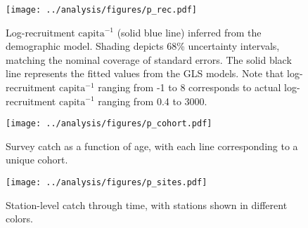 \documentclass[11pt]{article}
\begin{document}
\clearpage
\begin{figure}
\centering
\texttt{[image: ../analysis/figures/p\_rec.pdf]}
\caption{\label{fig:p_rec}
Log-recruitment $\text{capita}^{-1}$ (solid blue line) inferred from the demographic model.
Shading depicts 68\% uncertainty intervals, 
matching the nominal coverage of standard errors.
The solid black line represents the fitted values from the GLS models.
Note that log-recruitment $\text{capita}^{-1}$ ranging from -1 to 8 
corresponds to actual log-recruitment $\text{capita}^{-1}$ ranging from 0.4 to 3000.
}
\end{figure}
\clearpage







\renewcommand{\thefigure}{S\arabic{figure}}
\renewcommand{\theequation}{S\arabic{equation}}
\renewcommand{\thetable}{S\arabic{table}}
\setcounter{equation}{0}
\setcounter{figure}{0}
\setcounter{table}{0}

\begin{figure}
\centering
\texttt{[image: ../analysis/figures/p\_cohort.pdf]}
\caption{\label{fig:p_cohort}
Survey catch as a function of age, with each line corresponding to a unique cohort.
}
\end{figure}
\clearpage

\begin{figure}
\centering
\texttt{[image: ../analysis/figures/p\_sites.pdf]}
\caption{\label{fig:p_sites}
Station-level catch through time, with stations shown in different colors.
}
\end{figure}
\clearpage
\end{document}
